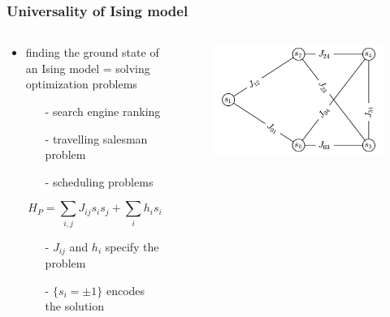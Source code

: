 \documentclass[11pt]{beamer}
\newcommand{\itemb}{\item[$\bullet$]}
\begin{document}
\begin{frame}
    \frametitle{Universality of Ising model}
    \begin{columns}[T]
        \begin{column}{0.6\textwidth}
            \begin{itemize}
                \itemb finding the ground state of an Ising model = solving optimization problems
                \begin{itemize}
                    \item [-] search engine ranking
                    \item [-] travelling salesman problem
                    \item [-] scheduling problems
                \end{itemize}
                \vspace*{0.3cm}
                \begin{equation*}
                    H_P = \sum_{i,j} J_{ij} s_i s_j + \sum_i h_i s_i
                    \label{eq:ising}
                \end{equation*}
                \begin{itemize}
                    \item [-] $J_{ij}$ and $h_i$ specify the problem
                    \item [-] $\{s_i = \pm 1\}$ encodes the solution
                \end{itemize}
            \end{itemize}
        \end{column}
        \begin{column}{0.4\textwidth}
            \vspace*{1cm}
            \begin{figure}[!htb]
                \centering
                \includegraphics[width=\textwidth]{../plots/graph_instance.pdf}
                \label{fig:ising}
            \end{figure}
        \end{column}
    \end{columns}
\end{frame}
\end{document}
